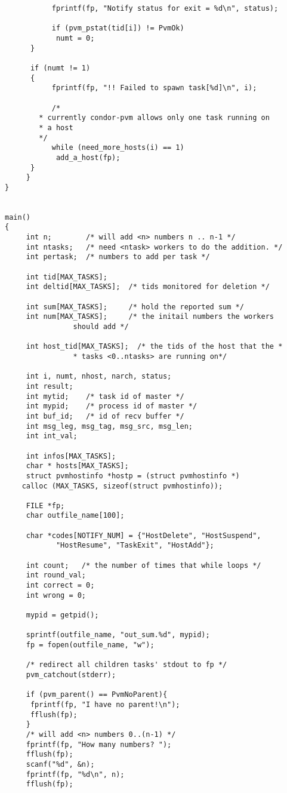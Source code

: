 \begin{small}
\begin{verbatim}
	       fprintf(fp, "Notify status for exit = %d\n", status);
	       
	       if (pvm_pstat(tid[i]) != PvmOk)
		    numt = 0;
	  }
	  
	  if (numt != 1)
	  {
	       fprintf(fp, "!! Failed to spawn task[%d]\n", i);
	       
	       /* 
		* currently condor-pvm allows only one task running on 
		* a host
		*/
	       while (need_more_hosts(i) == 1)
		    add_a_host(fp);
	  }
     }
}


main()
{
     int n;        /* will add <n> numbers n .. n-1 */
     int ntasks;   /* need <ntask> workers to do the addition. */
     int pertask;  /* numbers to add per task */

     int tid[MAX_TASKS];     
     int deltid[MAX_TASKS];  /* tids monitored for deletion */
     
     int sum[MAX_TASKS];     /* hold the reported sum */
     int num[MAX_TASKS];     /* the initail numbers the workers 
				should add */

     int host_tid[MAX_TASKS];  /* the tids of the host that the *
				* tasks <0..ntasks> are running on*/
     
     int i, numt, nhost, narch, status;
     int result;
     int mytid;    /* task id of master */
     int mypid;    /* process id of master */
     int buf_id;   /* id of recv buffer */
     int msg_leg, msg_tag, msg_src, msg_len;
     int int_val;  

     int infos[MAX_TASKS];
     char * hosts[MAX_TASKS];
     struct pvmhostinfo *hostp = (struct pvmhostinfo *) 
	calloc (MAX_TASKS, sizeof(struct pvmhostinfo));

     FILE *fp;
     char outfile_name[100];

     char *codes[NOTIFY_NUM] = {"HostDelete", "HostSuspend", 
			"HostResume", "TaskExit", "HostAdd"};
     
     int count;   /* the number of times that while loops */
     int round_val;
     int correct = 0;
     int wrong = 0;

     mypid = getpid();

     sprintf(outfile_name, "out_sum.%d", mypid);
     fp = fopen(outfile_name, "w"); 

     /* redirect all children tasks' stdout to fp */
     pvm_catchout(stderr);  

     if (pvm_parent() == PvmNoParent){
	  fprintf(fp, "I have no parent!\n");
	  fflush(fp);
     }
     /* will add <n> numbers 0..(n-1) */
     fprintf(fp, "How many numbers? ");
     fflush(fp);
     scanf("%d", &n);
     fprintf(fp, "%d\n", n);
     fflush(fp);


\end{verbatim}
\end{small}
